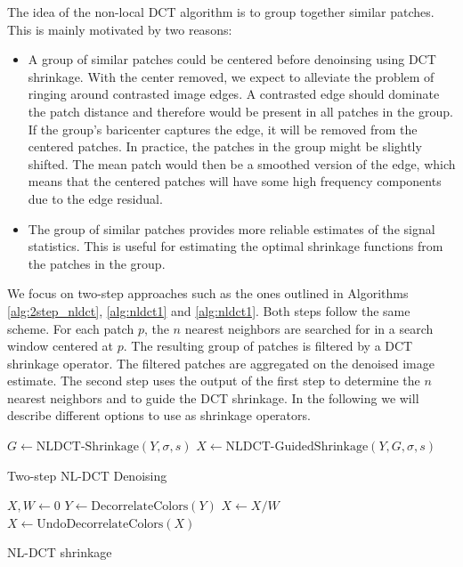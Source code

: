 \documentclass{ipol}
\begin{document}
The idea of the non-local DCT algorithm is to group together similar patches.
This is mainly motivated by two reasons:
\begin{itemize}
	\item A group of similar patches could be centered before denoinsing using
		DCT shrinkage. With the center removed, we expect to alleviate the problem
		of ringing around contrasted image edges. A contrasted edge should dominate the
		patch distance and therefore would be present in all patches in the
		group. If the group's baricenter captures the edge, it will be removed from the
		centered patches. In practice, the patches in the group might be slightly shifted.
		The mean patch would then be a smoothed version of the edge, which means that
		the centered patches will have some high frequency components due to the edge residual.
	\item The group of similar patches provides more reliable estimates of the signal 
		statistics. This is useful for estimating the optimal shrinkage functions from the 
		patches in the group.
\end{itemize}

We focus on two-step approaches such as the ones outlined in Algorithms 
\ref{alg:2step_nldct}, \ref{alg:nldct1} and \ref{alg:nldct1}. Both steps
follow the same scheme. For each patch $p$, the $n$ nearest neighbors are 
searched for in a search window centered at $p$. The resulting group of
patches is filtered by a DCT shrinkage operator. The filtered patches are 
aggregated on the denoised image estimate. The second step uses the output
of the first step to determine the $n$ nearest neighbors and to guide the 
DCT shrinkage. In the following we will describe different options to use as
shrinkage operators.


\begin{algorithm}
\DontPrintSemicolon
{}
$G \gets  \text{NLDCT-Shrinkage}(Y,\sigma, s)$\;
$X \gets  \text{NLDCT-GuidedShrinkage}(Y,G,\sigma, s)$\;
\caption{Two-step NL-DCT Denoising}
\label{alg:2step_nldct}
\end{algorithm}

\begin{algorithm}
\DontPrintSemicolon
{}
$X, W \gets  0$\;
$Y \gets   \text{DecorrelateColors}(Y)$\;
$ X \gets  X / W$ \;
$X \gets   \text{UndoDecorrelateColors}(X)$\;
\caption{NL-DCT shrinkage}
\label{alg:nldct1}
\end{algorithm}
\end{document}
